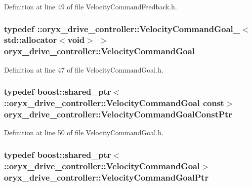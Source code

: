 \-Definition at line 49 of file \-Velocity\-Command\-Feedback.\-h.

\subsubsection[{\-Velocity\-Command\-Goal}]{\setlength{\rightskip}{0pt plus 5cm}typedef \-::{\bf oryx\-\_\-drive\-\_\-controller\-::\-Velocity\-Command\-Goal\-\_\-}$<$std\-::allocator$<$void$>$ $>$ {\bf oryx\-\_\-drive\-\_\-controller\-::\-Velocity\-Command\-Goal}}\label{namespaceoryx__drive__controller_aeaa04decbac98f50d6217f4ce3f9b0a0}


\-Definition at line 47 of file \-Velocity\-Command\-Goal.\-h.

\subsubsection[{\-Velocity\-Command\-Goal\-Const\-Ptr}]{\setlength{\rightskip}{0pt plus 5cm}typedef boost\-::shared\-\_\-ptr$<$ \-::{\bf oryx\-\_\-drive\-\_\-controller\-::\-Velocity\-Command\-Goal} const$>$ {\bf oryx\-\_\-drive\-\_\-controller\-::\-Velocity\-Command\-Goal\-Const\-Ptr}}\label{namespaceoryx__drive__controller_a3ff2664f9e9448433850c456405979e7}


\-Definition at line 50 of file \-Velocity\-Command\-Goal.\-h.

\subsubsection[{\-Velocity\-Command\-Goal\-Ptr}]{\setlength{\rightskip}{0pt plus 5cm}typedef boost\-::shared\-\_\-ptr$<$ \-::{\bf oryx\-\_\-drive\-\_\-controller\-::\-Velocity\-Command\-Goal}$>$ {\bf oryx\-\_\-drive\-\_\-controller\-::\-Velocity\-Command\-Goal\-Ptr}}\label{namespaceoryx__drive__controller_af453b84704c450e48761847df89e0e16}


